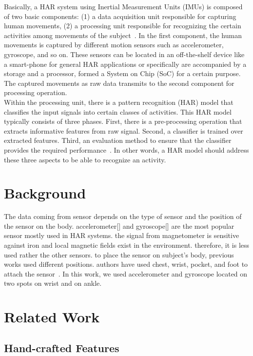 \documentclass[journal,article,submit,moreauthors,pdftex]{Definitions/mdpi}
\begin{document}
Basically, a HAR system using Inertial Measurement Units (IMUs) is composed of two basic components: (1) a data acquisition unit responsible for capturing human movements, (2) a processing unit responsible for recognizing the certain activities among movements of the subject~\cite{rosati2018comparison}. In the first component, the human movements is captured by different motion sensors such as accelerometer, gyroscope, and so on. These sensors can be located in an off-the-shelf device like a smart-phone for general HAR applications or specifically are accompanied by a storage and a processor, formed a System on Chip (SoC) for a certain purpose. The captured movements as raw data transmits to the second component for processing operation.\\
Within the processing unit, there is a pattern recognition (HAR) model that classifies the input signals into certain classes of activities. This HAR model typically consists of three phases. First, there is a pre-processing operation that extracts informative features from raw signal. Second, a classifier is trained over extracted features. Third, an evaluation method to ensure that the classifier provides the required performance~\cite{kolodziej2019registration}. In other words, a HAR model should address these three aspects to be able to recognize an activity.

\section{Background}
The data coming from sensor depends on the type of sensor and the position of the sensor on the body.
accelerometer[] and gyroscope[] are the most popular sensor mostly used in HAR systems. the signal from magnetometer is sensitive against iron and local magnetic fields exist in the environment. therefore, it is less used rather the other sensors. to place the sensor on subject's body, previous works used different positions. authors have used chest, wrist, pocket, and foot to attach the sensor~\cite{hassan2018robust, morris2014recofit, s140610146, wang2019survey}. In this work, we used accelerometer and gyroscope located on two spots on wrist and on ankle.

\section{Related Work}

\subsection{Hand-crafted Features}
\end{document}
